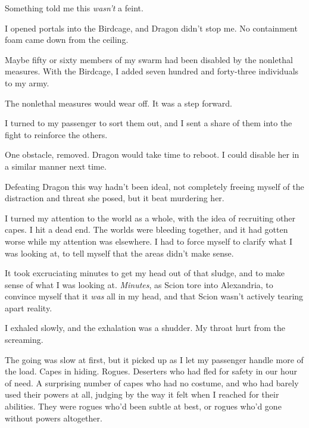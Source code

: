 Something told me this \emph{wasn't} a feint.



I opened portals into the Birdcage, and Dragon didn't stop me.  No containment foam came down from the ceiling.



Maybe fifty or sixty members of my swarm had been disabled by the nonlethal measures.  With the Birdcage, I added seven hundred and forty-three individuals to my army.



The nonlethal measures would wear off.  It was a step forward.



I turned to my passenger to sort them out, and I sent a share of them into the fight to reinforce the others.



One obstacle, removed.  Dragon would take time to reboot.  I could disable her in a similar manner next time.



Defeating Dragon this way hadn't been ideal, not completely freeing myself of the distraction and threat she posed, but it beat murdering her.



I turned my attention to the world as a whole, with the idea of recruiting other capes.  I hit a dead end.  The worlds were bleeding together, and it had gotten worse while my attention was elsewhere.  I had to force myself to clarify what I was looking at, to tell myself that the areas didn't make sense.



It took excruciating minutes to get my head out of that sludge, and to make sense of what I was looking at.  \emph{Minutes}, as Scion tore into Alexandria, to convince myself that it \emph{was} all in my head, and that Scion wasn't actively tearing apart reality.



I exhaled slowly, and the exhalation was a shudder.  My throat hurt from the screaming.



The going was slow at first, but it picked up as I let my passenger handle more of the load.  Capes in hiding.  Rogues.  Deserters who had fled for safety in our hour of need.  A surprising number of capes who had no costume, and who had barely used their powers at all, judging by the way it felt when I reached for their abilities.  They were rogues who'd been subtle at best, or rogues who'd gone without powers altogether.



